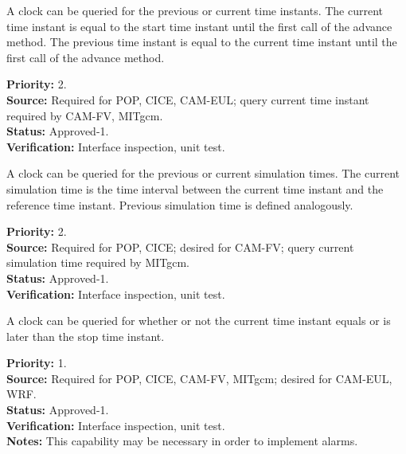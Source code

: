A clock can be queried for the previous or current time instants.
The current time instant is equal to the start time
instant until the first call of the advance method.
The previous time instant is equal to the current time
instant until the first call of the advance method.
\begin{reqlist}
{\bf Priority:} 2. \\
{\bf Source:} Required for POP, CICE, CAM-EUL; query current time instant required by CAM-FV, MITgcm. \\
{\bf Status:} Approved-1. \\
{\bf Verification:} Interface inspection, unit test. 
\end{reqlist}

A clock can be queried for the previous or current simulation times.
The current simulation time is the time interval between
the current time instant and the reference time instant.  Previous
simulation time is defined analogously.
\begin{reqlist}
{\bf Priority:} 2.\\
{\bf Source:} Required for POP, CICE; desired for CAM-FV; query current simulation time 
required by MITgcm. \\
{\bf Status:} Approved-1. \\
{\bf Verification:} Interface inspection, unit test. 
\end{reqlist}

A clock can be queried for whether or not the current time instant
equals or is later than the stop time instant.
\begin{reqlist}
{\bf Priority:} 1. \\
{\bf Source:} Required for POP, CICE, CAM-FV, MITgcm; desired for CAM-EUL, WRF. \\
{\bf Status:} Approved-1. \\
{\bf Verification:} Interface inspection, unit test. \\ 
{\bf Notes:} This capability may be necessary in order to implement alarms.
\end{reqlist}

\label{req:alarms}

